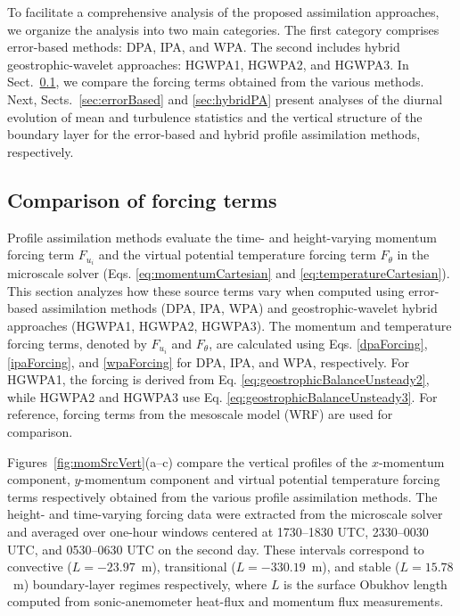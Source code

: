 To facilitate a comprehensive analysis of the proposed assimilation approaches, we organize the analysis into two main categories. The first category comprises error-based methods: DPA, IPA, and WPA. The second includes hybrid geostrophic-wavelet approaches: HGWPA1, HGWPA2, and HGWPA3. In Sect.~\ref{sec:forcingTerms}, we compare the forcing terms obtained from the various methods. Next, Sects.~\ref{sec:errorBased} and \ref{sec:hybridPA} present analyses of the diurnal evolution of mean and turbulence statistics and the vertical structure of the boundary layer for the error-based and hybrid profile assimilation methods, respectively.

\subsection{\textbf{Comparison of forcing terms}}
\label{sec:forcingTerms}

Profile assimilation methods evaluate the time- and height-varying momentum forcing term \(F_{u_i}\) and the virtual potential temperature forcing term \(F_{\theta}\) in the microscale solver (Eqs. \ref{eq:momentumCartesian} and \ref{eq:temperatureCartesian}). This section analyzes how these source terms vary when computed using error-based assimilation methods (DPA, IPA, WPA) and geostrophic-wavelet hybrid approaches (HGWPA1, HGWPA2, HGWPA3). The momentum and temperature forcing terms, denoted by \(F_{u_i}\) and \(F_{\theta}\), are calculated using Eqs. \ref{dpaForcing}, \ref{ipaForcing}, and \ref{wpaForcing} for DPA, IPA, and WPA, respectively. For HGWPA1, the forcing is derived from Eq. \ref{eq:geostrophicBalanceUnsteady2}, while HGWPA2 and HGWPA3 use Eq. \ref{eq:geostrophicBalanceUnsteady3}. For reference, forcing terms from the mesoscale model (WRF) are used for comparison.

Figures~\ref{fig:momSrcVert}(a--c) compare the vertical profiles of the $x$-momentum component, $y$-momentum component and virtual potential temperature forcing terms respectively obtained from the various profile assimilation methods. The height- and time-varying forcing data were extracted from the microscale solver and averaged over one-hour windows centered at 1730--1830 UTC, 2330--0030 UTC, and 0530--0630 UTC on the second day. These intervals correspond to convective (\(L = -23.97\)~m), transitional (\(L = -330.19\)~m), and stable (\(L = 15.78\)~m) boundary-layer regimes respectively, where \(L\) is the surface Obukhov length computed from sonic-anemometer heat-flux and momentum flux measurements.

